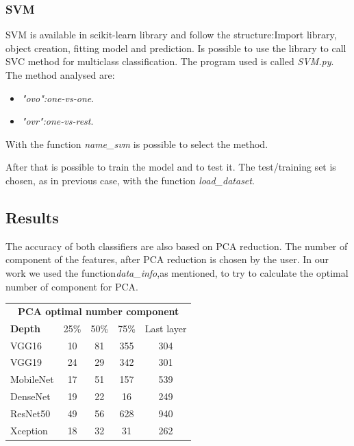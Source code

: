 \documentclass[12pt]{article} %
\begin{document}
\subsubsection {SVM}
SVM  is available in scikit-learn library and follow the structure:Import library, object creation, fitting model and prediction. 
Is possible to use the library to call SVC method  for multiclass classification.
The program used is called \textit{SVM.py}.\\
The method analysed are:
\begin{itemize}
\item  \textit{"ovo":one-vs-one}.
\item  \textit{"ovr":one-vs-rest}.
\end{itemize}
With the function  \textit{name\_svm} is possible to select the method.
\begin{figure}[H] %
\end{figure}
After that is possible to train the model and to test it. The test/training set is chosen, as in previous case, with the function \textit{load\_dataset}.

\newpage 

\subsection {Results}
The accuracy of both classifiers are also based on PCA reduction. The number of component of the features, after PCA reduction is chosen by the user.
In our work we used the function\textit{data\_info},as mentioned, to try to calculate the optimal number of component for PCA.\\

\begin{center}
\begin{tabular}{l|c|c|c|c|}
 \multicolumn{5}{c}{ \textbf{ PCA optimal number component}}\\
 \textbf{Depth}&25\%&50\%&75\%&Last layer\\ \hline\hline
VGG16   &10&81&355&304\\
VGG19 &24&29&342&301\\
MobileNet &17&51&157&539\\
DenseNet &19&22&16&249\\
ResNet50 &49&56&628&940\\
Xception&18&32&31&262\\
\end{tabular}
\end{center}
\end{document}
